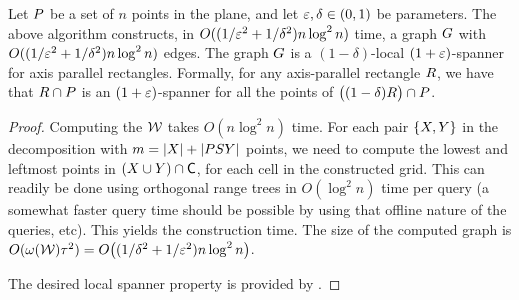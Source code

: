 \documentclass[12pt]{article}%
\begin{document}
\begin{theorem}
    Let $P$ be a set of $n$ points in the plane, and let
    $\varepsilon, \delta \in (0,1)$ be parameters. The above algorithm
    constructs, in $O((1/\varepsilon^2 + 1/\delta^2) n \log^2 n)$ time, a
    graph $G$ with $O((1/\varepsilon^2 + 1/\delta^2) n \log^2 n)$ edges. The
    graph $G$ is a $(1-\delta)$-local $(1+\varepsilon)$-spanner for axis
    parallel rectangles. Formally, for any axis-parallel rectangle
    $R$, we have that $R \cap P$ is an $(1+\varepsilon)$-spanner
    for all the points of $\bigl((1-\delta)R \bigr)\cap P$.
\end{theorem}
\begin{proof}
    Computing the \QSPD $\mathcal{W}$ takes $O(n \log^2 n)$ time. For each
    pair $\{X, Y\}$ in the decomposition with
    $m = |X| + |PSY|$ points, we need to compute the lowest and
    leftmost points in $(X \cup Y) \cap \mathsf{C}$, for each cell in
    the constructed grid. This can readily be done using orthogonal
    range trees in $O( \log^2 n)$ time per query (a somewhat faster
    query time should be possible by using that offline nature of the
    queries, etc). This yields the construction time. The size of the
    computed graph is
    $O(\WeightX{\WS} \gConst^2) = O\bigl((1/\delta^2 + 1/\eps^2) n
    \log^2 n\bigr)$.

    The desired local spanner property is provided by
    .
\end{proof}






% 

\end{document}
